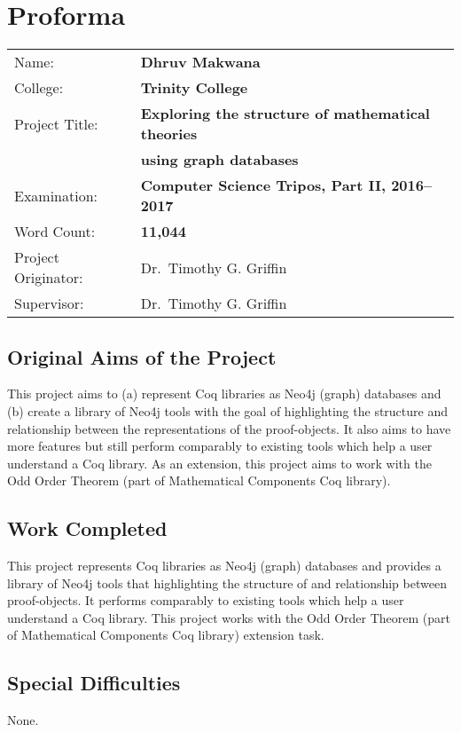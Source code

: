 \chapter*{Proforma}

{%
\begin{tabular}{ll}
Name:               & \bf Dhruv Makwana \\
College:            & \bf Trinity College                     \\
Project Title:      & \bf Exploring the structure of mathematical theories \\
                    & \bf using graph databases \\
Examination:        & \bf Computer Science Tripos, Part II, 2016--2017 \\
Word Count:         & \bf 11,044 \\
Project Originator: & Dr.\ Timothy G. Griffin \\
Supervisor:         & Dr.\ Timothy G. Griffin \\
\end{tabular}
}

\section*{Original Aims of the Project}

This project aims to (a) represent Coq libraries as Neo4j (graph) databases and
(b) create a library of Neo4j tools with the goal of highlighting the structure
and relationship between the representations of the proof-objects.  It also
aims to have more features but still perform comparably to existing tools which
help a user understand a Coq library. As an extension, this project aims to
work with the Odd Order Theorem (part of Mathematical Components Coq library).

\section*{Work Completed}

This project represents Coq libraries as Neo4j (graph) databases and provides a
library of Neo4j tools that highlighting the structure of and relationship
between proof-objects. It performs comparably to existing tools which help a
user understand a Coq library. This project works with the Odd Order Theorem
(part of Mathematical Components Coq library) extension task.

\section*{Special Difficulties}
None.

